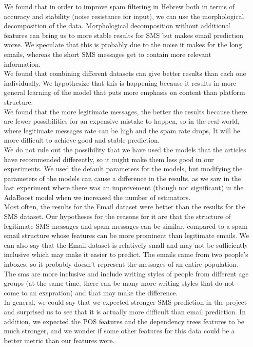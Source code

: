 \documentclass[11pt,a4paper]{article}
\begin{document}
\noindent We found that in order to improve spam filtering in Hebrew both in terms of accuracy and stability (noise resistance for input), we can use the morphological decomposition of the data. Morphological decomposition without additional features can bring us to more stable results for SMS but makes email prediction worse. We speculate that this is probably due to the noise it makes for the long emails, whereas the short SMS messages get to contain more relevant information.\\
We found that combining different datasets can give better results than each one individually. We hypothesize that this is happening because it results in more general learning of the model that puts more emphasis on content than platform structure.\\
We found that the more legitimate messages, the better the results because there are fewer possibilities for an expensive mistake to happen, so in the real-world, where legitimate messages rate can be high and the spam rate drops, It will be more difficult to achieve good and stable prediction.\\
We do not rule out the possibility that we have used the models that the articles have recommended differently, so it might make them less good in our experiments. We used the default parameters for the models, but modifying the parameters of the models can cause a difference in the results, as we saw in the last experiment where there was an improvement (though not significant) in the AdaBoost model when we increased the number of estimators.\\
Most often, the results for the Email dataset were better than the results for the SMS dataset. Our hypotheses for the reasons for it are that the structure of legitimate SMS messages and spam messages can be similar, compared to a spam email structure whose features can be more prominent than legitimate emails.
We can also say that the Email dataset is relatively small and may not be sufficiently inclusive which may make it easier to predict. The emails came from two people's inboxes, so it probably doesn't represent the messages of an entire population. The sms are more inclusive and include writing styles of people from different age groups (at the same time, there can be many more writing styles that do not come to an exspration) and that may make the difference.\\
In general, we could say that we expected stronger SMS prediction in the project and surprised us to see that it is actually more difficult than email prediction. In addition, we expected the POS features and the dependency trees features to be much stronger, and we wonder if some other features for this data could be a better metric than our features were.\\
\end{document}
